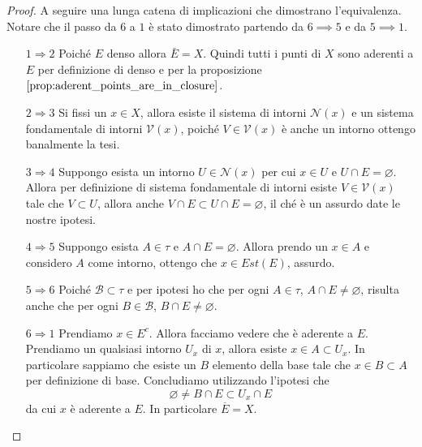 \begin{proof}
	A seguire una lunga catena di implicazioni che dimostrano l'equivalenza. Notare che il passo da $6$ a $1$ è stato dimostrato partendo da $6 \implies 5$ e da $5 \implies 1$.
	\begin{enumerate}
		\item[$1 \Rightarrow 2$] Poiché $E$ denso allora $\bar{E} = X$. Quindi tutti i punti di $X$ sono aderenti a $E$ per definizione di denso e per la proposizione $\ref{prop:aderent_points_are_in_closure}$.
		\item[$2 \Rightarrow 3$] Si fissi un $x \in X$, allora esiste il sistema di intorni $\mathcal{N}(x)$ e un sistema fondamentale di intorni $\mathcal{V}(x)$, poiché $V \in \mathcal{V}(x)$ è anche un intorno ottengo banalmente la tesi.
		\item[$3 \Rightarrow 4$] Suppongo esista un intorno $U \in \mathcal{N}(x)$ per cui $x \in U$ e $U \cap E = \varnothing$. Allora per definizione di sistema fondamentale di intorni esiste $V \in \mathcal{V}(x)$ tale che $V \subset U$, allora anche $V \cap E \subset U \cap E = \varnothing$, il ché è un assurdo date le nostre ipotesi.  
		\item[$4 \Rightarrow 5$] Suppongo esista $A \in \tau$ e $A \cap E = \varnothing$. Allora prendo un $x \in A$ e considero $A$ come intorno, ottengo che $x \in Est(E)$, assurdo.  
		\item[$5 \Rightarrow 6$] Poiché $\mathcal{B} \subset \tau$ e per ipotesi ho che per ogni $A \in \tau$, $A \cap E \neq \varnothing$, risulta anche che per ogni $B \in \mathcal{B}$, $B \cap E \neq \varnothing$.
		\item[$6 \Rightarrow 1$] Prendiamo $x \in E^c$. Allora facciamo vedere che è aderente a $E$. Prendiamo un qualsiasi intorno $U_x$ di $x$, allora esiste $x \in A \subset U_x$. In particolare sappiamo che esiste un $B$ elemento della base tale che $x \in B \subset A$ per definizione di base. Concludiamo utilizzando l'ipotesi che 
			\begin{equation*}
				\varnothing \neq B \cap E \subset U_x \cap E
			\end{equation*}
		da cui $x$ è aderente a $E$. In particolare $\overline{E} = X$. 
	\end{enumerate}
\end{proof}

